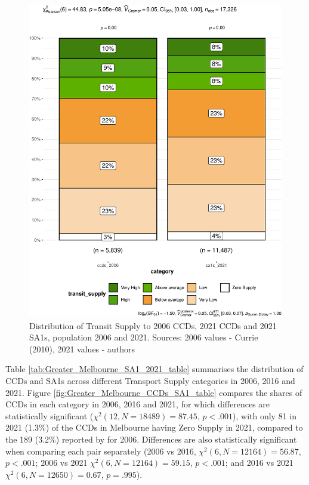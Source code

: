\documentclass[preprint, 3p,
authoryear]{elsarticle} %
\begin{document}
\begin{figure}
\centering
\includegraphics{Leveraging_GTFS_to_assess_transit_supply_Transport_Geography_files/figure-latex/Greater_Melbourne_SA1s_bar_stats-1.pdf}
\caption{Distribution of Transit Supply to 2006 CCDs, 2021 CCDs and 2021
SA1s, population 2006 and 2021. Sources: 2006 values - Currie (2010),
2021 values - authors}
\end{figure}

Table \ref{tab:Greater_Melbourne_SA1_2021_table} summarises the
distribution of CCDs and SA1s across different Transport Supply
categories in 2006, 2016 and 2021. Figure
\ref{fig:Greater_Melbourne_CCDs_SA1_table} compares the shares of CCDs
in each category in 2006, 2016 and 2021, for which differences are
statistically significant (\(\chi^2(12, N = 18489) = 87.45\),
\(p < .001\)), with only 81 in 2021 (1.3\%) of the CCDs in Melbourne
having Zero Supply in 2021, compared to the 189 (3.2\%) reported by
\citet{currie2010identifying} for 2006. Differences are also
statistically significant when comparing each pair separately (2006 vs
2016, \(\chi^2(6, N = 12164) = 56.87\), \(p < .001\); 2006 vs 2021
\(\chi^2(6, N = 12164) = 59.15\), \(p < .001\); and 2016 vs 2021
\(\chi^2(6, N = 12650) = 0.67\), \(p = .995\)).
\end{document}

